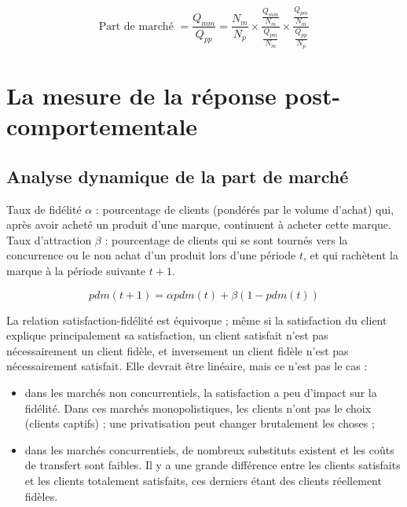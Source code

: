 		
		$$\text{Part de marché } = \frac{Q_{mm}}{Q_{pp}} = \frac{N_m}{N_p} \times \frac{ \frac{Q_{mm}}{N_m} }{ \frac{Q_{pm}}{N_m} } \times \frac{ \frac{Q_{pm}}{N_m} }{ \frac{Q_{pp}}{N_p} }$$
		
	
	\section{La mesure de la réponse post-comportementale}
	
		\subsection{Analyse dynamique de la part de marché}
	
		Taux de fidélité $\alpha$ : pourcentage de clients (pondérés par le volume d'achat)	qui, après avoir acheté un produit d'une marque, continuent à acheter cette marque. \\
	
		Taux d'attraction $\beta$ : pourcentage de clients qui se sont tournés vers la concurrence ou le non achat d'un produit lors d'une période $t$, et qui rachètent la marque à la période suivante $t + 1$.
	
	
		$$pdm(t + 1) = \alpha pdm(t) + \beta (1 - pdm(t))$$
	
	
		La relation satisfaction-fidélité est équivoque ; même si la satisfaction du client explique principalement sa satisfaction, un client satisfait n'est pas nécessairement un client fidèle, et inversement un client fidèle n'est pas nécessairement satisfait. Elle devrait être linéaire, mais ce n'est pas le cas :
		
		\begin{itemize}
			\item dans les marchés non concurrentiels, la satisfaction a peu d'impact sur la fidélité. Dans ces marchés monopolistiques, les clients n'ont pas le choix (clients captifs) ; une privatisation peut changer brutalement les choses ;
			\item dans les marchés concurrentiels, de nombreux substituts existent et les coûts de transfert sont faibles. Il y a une grande différence entre les clients satisfaits et les clients totalement satisfaits, ces derniers étant des clients réellement fidèles.
		\end{itemize}
	
	
		
